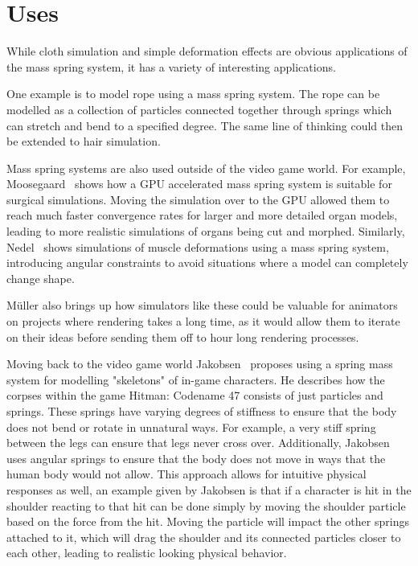 \chapter{Uses}
While cloth simulation and simple deformation effects are obvious applications of the mass spring system, 
it has a variety of interesting applications.

One example is to model rope using a mass spring system. The rope can be modelled as a collection of particles
connected together through springs which can stretch and bend to a specified degree.
The same line of thinking could then be extended to hair simulation.

Mass spring systems are also used outside of the video game world.
For example, Moosegaard~\cite{mosegaards_clothing_simulation} shows how a GPU accelerated mass spring system is suitable 
for surgical simulations. Moving the simulation over to the GPU allowed them to reach much faster convergence rates for
larger and more detailed organ models, leading to more realistic simulations of organs being cut and morphed.
Similarly, Nedel~\cite{nedel_muscle_spring_mass} shows simulations of muscle deformations using a mass spring system,
introducing angular constraints to avoid situations where a model can completely change shape.

Müller\cite{muller_fem} also brings up how simulators like these could be valuable for animators on projects where
rendering takes a long time, as it would allow them to iterate on their ideas before sending them off to hour long rendering processes.

Moving back to the video game world Jakobsen~\cite{jakobsen_advanced_character_physics} proposes using a spring mass system
for modelling "skeletons" of in-game characters. 
He describes how the corpses within the game Hitman: Codename 47 consists of just particles and springs.
These springs have varying degrees of stiffness to ensure that the body does not bend or rotate in unnatural ways.
For example, a very stiff spring between the legs can ensure that legs never cross over.
Additionally, Jakobsen uses angular springs to ensure that the body does not move in ways that the human body would not allow.
This approach allows for intuitive physical responses as well, an example given by Jakobsen is that if a character is hit in the shoulder
reacting to that hit can be done simply by moving the shoulder particle based on the force from the hit.
Moving the particle will impact the other springs attached to it, which will drag the shoulder and its connected particles closer to each other,
leading to realistic looking physical behavior.
